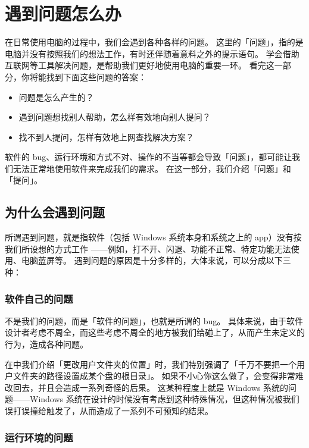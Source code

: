 \chapter{遇到问题怎么办}
\label{how-to-find-solutions}

\begin{intro}
  在日常使用电脑的过程中，我们会遇到各种各样的问题。
  这里的「问题」，指的是电脑并没有按照我们的想法工作，有时还伴随着意料之外的提示语句。
  学会借助互联网等工具解决问题，是帮助我们更好地使用电脑的重要一环。
  看完这一部分，你将能找到下面这些问题的答案：
  \begin{itemize}
    \item 问题是怎么产生的？
    \item 遇到问题想找别人帮助，怎么样有效地向别人提问？
    \item 找不到人提问，怎样有效地上网查找解决方案？
  \end{itemize}
\end{intro}

软件的 bug、运行环境和方式不对、操作的不当等都会导致「问题」，都可能让我们无法正常地使用软件来完成我们的需求。
在这一部分，我们介绍「问题」和「提问」。

\section{为什么会遇到问题}

所谓遇到问题，就是指软件（包括 Windows 系统本身和系统之上的 app）没有按我们所设想的方式工作
——例如，打不开、闪退、功能不正常、特定功能无法使用、电脑蓝屏等。
遇到问题的原因是十分多样的，大体来说，可以分成以下三种：

\subsection{软件自己的问题}

不是我们的问题，而是「软件的问题」，也就是所谓的 bug。
具体来说，由于软件设计者考虑不周全，而这些考虑不周全的地方被我们给碰上了，从而产生未定义的行为，造成各种问题。

在中我们介绍「更改用户文件夹的位置」时，我们特别强调了「千万不要把一个用户文件夹的路径设置成某个盘的根目录」。
如果不小心你这么做了，会变得非常难改回去，并且会造成一系列奇怪的后果。
这某种程度上就是 Windows 系统的问题——Windows 系统在设计的时候没有考虑到这种特殊情况，但这种情况被我们误打误撞给触发了，从而造成了一系列不可预知的结果。

\subsection{运行环境的问题}

